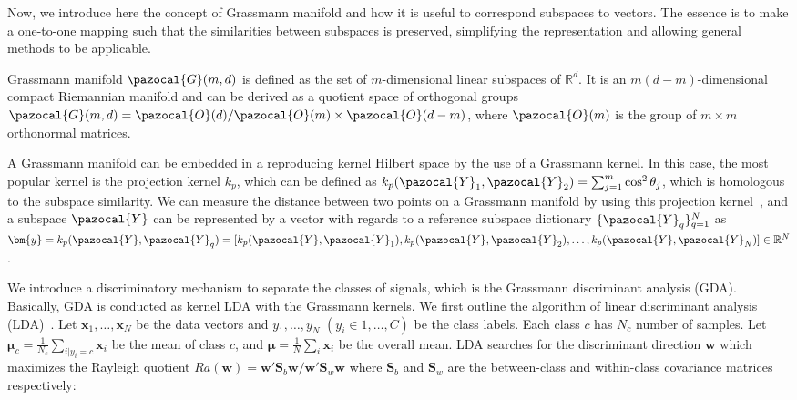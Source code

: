 Now, we introduce here the concept of Grassmann manifold and how it is useful to correspond subspaces to vectors. The essence is to make a one-to-one mapping such that the similarities between subspaces is preserved, simplifying the representation and allowing general methods to be applicable.

Grassmann manifold $\pazocal{G}(m, d)$ is defined as the set of $m$-dimensional linear subspaces of $\mathbb{R}^{d}$. It is an $m(d-m)$-dimensional compact Riemannian manifold and can be derived as a quotient space of orthogonal groups $\pazocal{G}(m, d) = \pazocal{O}(d)/\pazocal{O}(m) \times \pazocal{O}(d - m)$,
where $\pazocal{O}(m)$ is the group of $m \times m$ orthonormal matrices.

A Grassmann manifold can be embedded in a reproducing kernel Hilbert space by the use of a Grassmann kernel. In this case, the most popular kernel is the projection kernel $k_{p}$, which can be defined as $k_{p}(\pazocal{Y}_{1},\pazocal{Y}_{2}) = \sum_{j=1}^{m} \cos^{2} \theta_{j}$, which is homologous to the subspace similarity.
We can measure the distance between two points on a Grassmann manifold by using this projection kernel~\cite{hamm2008thesis}, and a subspace $\pazocal{Y}$ can be represented by a vector with regards to a reference subspace dictionary $\{\pazocal{Y}_{q}\}_{q=1}^{N}$ as $\bm{y} = k_{p}(\pazocal{Y},\pazocal{Y}_{q}) = [k_{p}(\pazocal{Y},\pazocal{Y}_{1}),k_{p}(\pazocal{Y},\pazocal{Y}_{2}),\ldots,k_{p}(\pazocal{Y},\pazocal{Y}_{N})] \in \mathbb{R}^{N}$.


We introduce a discriminatory mechanism to separate the classes of signals, which is the Grassmann discriminant analysis (GDA).
Basically, GDA is conducted as kernel LDA with the Grassmann kernels.
We first outline the algorithm of linear discriminant analysis (LDA)~\cite{fukunaga1990statistical}.
Let ${\bm{x}_{1}, \ldots, \bm{x}_{N}}$ be the data vectors and ${y_{1}, \ldots, y_{N}}$ $(y_{i} \in {1, \ldots, C})$ be the class labels.
Each class $c$ has $N_{c}$ number of samples.
Let $\bm{\mu}_{c} = \frac{1}{N_{c}}\sum_{i|y_{i} = c} \bm{x}_{i}$ be the mean of class $c$, and $\bm{\mu} = \frac{1}{N} \sum_{i} \bm{x}_{i}$ be the overall mean. LDA searches for the discriminant direction $\bm{w}$ which maximizes the Rayleigh quotient
$Ra(\bm{w}) = \bm{w}'\bm{S}_{b}\bm{w}/\bm{w}'\bm{S}_{w}\bm{w}$ where $\bm{S}_{b}$ and $\bm{S}_{w}$ are the between-class and within-class covariance matrices respectively:

